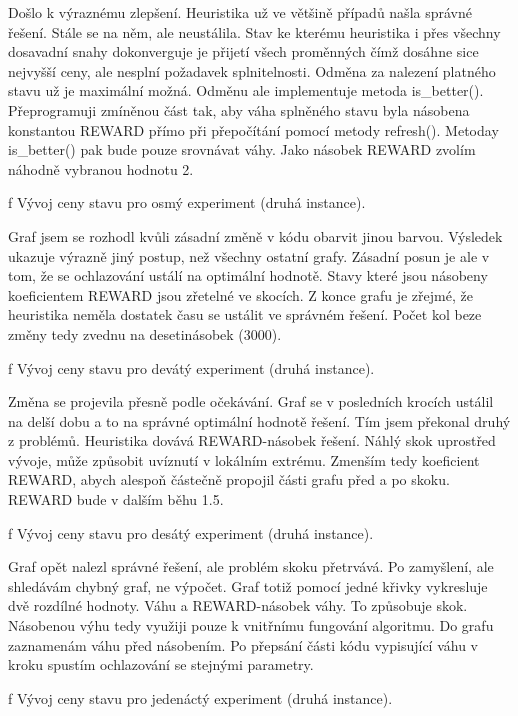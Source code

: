 Došlo k výraznému zlepšení. Heuristika už ve většině případů našla správné řešení. Stále se na něm, ale neustálila. Stav ke kterému heuristika i přes všechny dosavadní snahy dokonverguje je přijetí všech proměnných čímž dosáhne sice nejvyšší ceny, ale nesplní požadavek splnitelnosti. Odměna za nalezení platného stavu už je maximální možná. Odměnu ale implementuje metoda is\_better(). Přeprogramuji zmíněnou část tak, aby váha splněného stavu byla násobena konstantou REWARD přímo při přepočítání pomocí metody refresh(). Metoday is\_better() pak bude pouze srovnávat váhy. Jako násobek REWARD zvolím náhodně vybranou hodnotu 2.

\centerline{ \picwidth=15cm  }
\caption/f Vývoj ceny stavu pro osmý experiment (druhá instance).
\bigskip

Graf jsem se rozhodl kvůli zásadní změně v kódu obarvit jinou barvou. Výsledek ukazuje výrazně jiný postup, než všechny ostatní grafy. Zásadní posun je ale v tom, že se ochlazování ustálí na optimální hodnotě. Stavy které jsou násobeny koeficientem REWARD jsou zřetelné ve skocích. Z konce grafu je zřejmé, že heuristika neměla dostatek času se ustálit ve správném řešení. Počet kol beze změny tedy zvednu na desetinásobek (3000).

\centerline{ \picwidth=15cm  }
\caption/f Vývoj ceny stavu pro devátý experiment (druhá instance).
\bigskip

Změna se projevila přesně podle očekávání. Graf se v posledních krocích ustálil na delší dobu a to na správné optimální hodnotě řešení. Tím jsem překonal druhý z problémů. Heuristika dovává REWARD-násobek řešení. Náhlý skok uprostřed vývoje, může způsobit uvíznutí v lokálním extrému. Zmenším tedy koeficient REWARD, abych alespoň částečně propojil části grafu před a po skoku. REWARD bude v dalším běhu 1.5.

\centerline{ \picwidth=15cm  }
\caption/f Vývoj ceny stavu pro desátý experiment (druhá instance).
\bigskip

Graf opět nalezl správné řešení, ale problém skoku přetrvává. Po zamyšlení, ale shledávám chybný graf, ne výpočet. Graf totiž pomocí jedné křivky vykresluje dvě rozdílné hodnoty. Váhu a REWARD-násobek váhy. To způsobuje skok. Násobenou výhu tedy využiji pouze k vnitřnímu fungování algoritmu. Do grafu zaznamenám váhu před násobením. Po přepsání části kódu vypisující váhu v kroku spustím ochlazování se stejnými parametry.

\centerline{ \picwidth=15cm  }
\caption/f Vývoj ceny stavu pro jedenáctý experiment (druhá instance).
\bigskip


